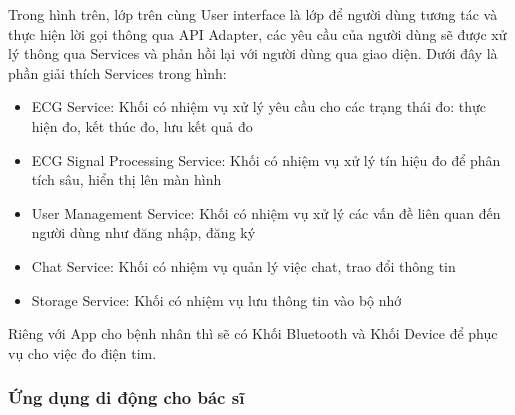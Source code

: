 Trong hình trên, lớp trên cùng User interface là lớp để người dùng tương tác và thực hiện lời gọi thông qua API Adapter, 
các yêu cầu của người dùng sẽ được xử lý thông qua Services và phản hồi lại với người dùng qua giao diện. Dưới đây là phần
giải thích Services trong hình:
\begin{adjustwidth}{1.5em}{}
\begin{itemize}
  \item ECG Service: Khối có nhiệm vụ xử lý yêu cầu cho các trạng thái đo: thực hiện đo, kết thúc đo, lưu kết quả đo
  \item ECG Signal Processing Service: Khối có nhiệm vụ xử lý tín hiệu đo để phân tích sâu, hiển thị lên màn hình
  \item User Management Service: Khối có nhiệm vụ xử lý các vấn đề liên quan đến người dùng như đăng nhập, đăng ký
  \item Chat Service: Khối có nhiệm vụ quản lý việc chat, trao đổi thông tin
  \item Storage Service: Khối có nhiệm vụ lưu thông tin vào bộ nhớ
\end{itemize}
\end{adjustwidth}

Riêng với App cho bệnh nhân thì sẽ có Khối Bluetooth và Khối Device để phục vụ cho việc đo điện tim.
\subsubsection{Ứng dụng di động cho bác sĩ}

